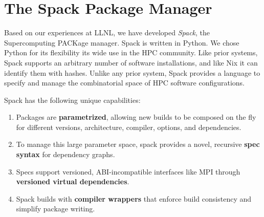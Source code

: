 
\section{The Spack Package Manager}
\label{sec:implementation}
Based on our experiences at LLNL, we have developed
{\it Spack}, the Supercomputing PACKage manager.
Spack is written in Python.  We chose Python for its flexibility
its wide use in the HPC community.
%
Like prior systems, Spack supports an arbitrary number of software
installations, and like Nix it can identify them with hashes.  Unlike any
prior system, Spack provides a language to specify and manage the
combinatorial space of HPC software configurations.

\noindent
Spack has the following unique capabilities:
\begin{enumerate}
\item Packages are {\bf parametrized}, allowing new builds to be composed
      on the fly for different versions, architecture, compiler, options, 
      and dependencies.
\item To manage this large parameter space, spack provides a novel, 
      recursive {\bf spec syntax} for dependency graphs.
\item Specs support versioned, ABI-incompatible interfaces like MPI through
      {\bf versioned virtual dependencies}.
\item Spack builds with {\bf compiler wrappers} that enforce build
      consistency and simplify package writing.
\end{enumerate}












